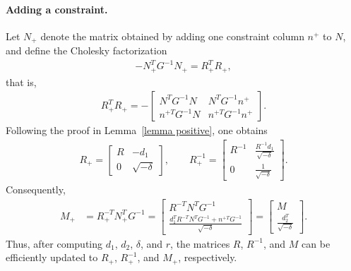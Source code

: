\documentclass{article}
\begin{document}
	\paragraph{Adding a constraint.}
	Let $N_{+}$ denote the matrix obtained by adding one constraint column $n^{+}$ to $N$, and define the Cholesky factorization
	\begin{align*}
		-N_{+}^{T}G^{-1}N_{+} = R_{+}^{T}R_{+},
	\end{align*}
	that is,
	\begin{align*}
		R_{+}^{T}R_{+} = -\begin{bmatrix}
			N^{T}G^{-1}N & N^{T}G^{-1}n^{+}\\
			n^{+T}G^{-1}N & n^{+T}G^{-1}n^{+}
		\end{bmatrix}.
	\end{align*}
	Following the proof in Lemma~\ref{lemma positive}, one obtains
	\begin{align*}
		R_{+} = 
		\begin{bmatrix}
			R & -d_{1}\\
			0 & \sqrt{-\delta}
		\end{bmatrix},
		\qquad
		R_{+}^{-1} = 
		\begin{bmatrix}
			R^{-1} & \frac{R^{-1}d_{1}}{\sqrt{-\delta}}\\
			0 & \frac{1}{\sqrt{-\delta}}
		\end{bmatrix}.
	\end{align*}
	Consequently,
	\begin{align*}
		M_{+} 
		&= R_{+}^{-T}N_{+}^{T}G^{-1}
		= 
		\begin{bmatrix}
			R^{-T}N^{T}G^{-1}\\
			\frac{d_{1}^{T}R^{-T}N^{T}G^{-1} + n^{+T}G^{-1}}{\sqrt{-\delta}}
		\end{bmatrix}
		=
		\begin{bmatrix}
			M\\
			\frac{d_{2}^{T}}{\sqrt{-\delta}}
		\end{bmatrix}.
	\end{align*}
	Thus, after computing $d_{1}$, $d_{2}$, $\delta$, and $r$, the matrices $R$, $R^{-1}$, and $M$ can be efficiently updated to $R_{+}$, $R_{+}^{-1}$, and $M_{+}$, respectively.
	
\end{document}
